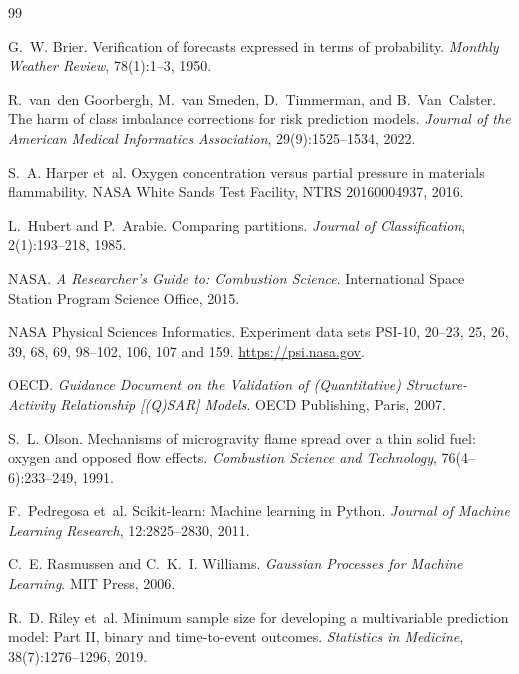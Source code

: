 \documentclass[11pt,twocolumn]{article}
\begin{document}
\small
\begin{thebibliography}{99}
\setlength{\itemsep}{1pt}

G.~W. Brier.
\newblock Verification of forecasts expressed in terms of probability.
\newblock \emph{Monthly Weather Review}, 78(1):1--3, 1950.

R.~van~den Goorbergh, M.~van Smeden, D.~Timmerman, and B.~Van~Calster.
\newblock The harm of class imbalance corrections for risk prediction models.
\newblock \emph{Journal of the American Medical Informatics Association}, 29(9):1525--1534, 2022.

S.~A. Harper et~al.
\newblock Oxygen concentration versus partial pressure in materials flammability.
\newblock NASA White Sands Test Facility, NTRS 20160004937, 2016.

L.~Hubert and P.~Arabie.
\newblock Comparing partitions.
\newblock \emph{Journal of Classification}, 2(1):193--218, 1985.

NASA.
\newblock \emph{A Researcher's Guide to: Combustion Science}.
\newblock International Space Station Program Science Office, 2015.

NASA Physical Sciences Informatics.
\newblock Experiment data sets PSI-10, 20--23, 25, 26, 39, 68, 69, 98--102, 106, 107 and 159.
\newblock \url{https://psi.nasa.gov}.

OECD.
\newblock \emph{Guidance Document on the Validation of (Quantitative) Structure-Activity Relationship
[(Q)SAR] Models}.
\newblock OECD Publishing, Paris, 2007.

S.~L. Olson.
\newblock Mechanisms of microgravity flame spread over a thin solid fuel: oxygen and opposed flow effects.
\newblock \emph{Combustion Science and Technology}, 76(4--6):233--249, 1991.

F.~Pedregosa et~al.
\newblock Scikit-learn: Machine learning in Python.
\newblock \emph{Journal of Machine Learning Research}, 12:2825--2830, 2011.

C.~E. Rasmussen and C.~K.~I. Williams.
\newblock \emph{Gaussian Processes for Machine Learning}.
\newblock MIT Press, 2006.

R.~D. Riley et~al.
\newblock Minimum sample size for developing a multivariable prediction model: Part II, binary and
time-to-event outcomes.
\newblock \emph{Statistics in Medicine}, 38(7):1276--1296, 2019.


\end{thebibliography}
\end{document}
